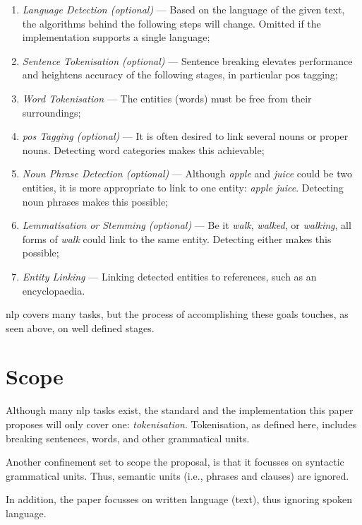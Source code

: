 \begin{enumerate}
\item\emph{Language Detection (optional)} --- Based on the language of the
    given text, the algorithms behind the following steps will change.
  Omitted if the implementation supports a single language;
\item\emph{Sentence Tokenisation (optional)} --- Sentence breaking elevates
    performance and heightens accuracy of the following stages, in
    particular \acrshort{pos} tagging;
\item\emph{Word Tokenisation} --- The entities (words) must be free from
  their surroundings;
\item\emph{\acrfull{pos} Tagging (optional)} --- It is often desired to link
    several nouns or proper nouns.
  Detecting word categories makes this achievable;
\item\emph{Noun Phrase Detection (optional)} --- Although \emph{apple} and
    \emph{juice} could be two entities, it is more appropriate to link to
    one entity: \emph{apple juice}.
  Detecting noun phrases makes this possible;
\item\emph{Lemmatisation or Stemming (optional)} --- Be it \emph{walk},
    \emph{walked}, or \emph{walking}, all forms of \emph{walk} could link
    to the same entity.
  Detecting either makes this possible;
\item\emph{Entity Linking} --- Linking detected entities to references, such
    as an encyclopaedia.
\end{enumerate}

\noindent \gls{nlp} covers many tasks, but the process of accomplishing these
  goals touches, as seen above, on well defined stages.

\section{Scope}\label{scope}

Although many \gls{nlp} tasks exist, the standard and the implementation
  this paper proposes will only cover one: \emph{tokenisation}.
Tokenisation, as defined here, includes breaking sentences, words, and
other grammatical units.

Another confinement set to scope the proposal, is that it focusses on
  syntactic grammatical units. Thus, semantic units (i.e., phrases and
  clauses) are ignored.

In addition, the paper focusses on written language (text), thus ignoring
  spoken language.

